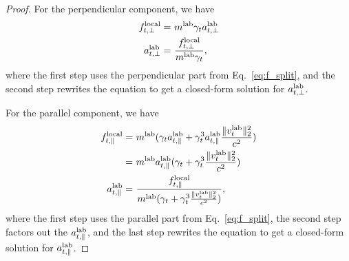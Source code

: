 \begin{proof}
For the perpendicular component, we have
\begin{align*}
    f_{t, \perp}^{\rm local} = & ~ m^{\rm lab}\gamma_t  a_{t,\perp}^{\rm lab} \\
    a_{t,\perp}^{\rm lab} =  & ~ \frac{f_{t, \perp}^{\rm local}}{m^{\rm lab}\gamma_t},
\end{align*}
where the first step uses the perpendicular part from Eq.~\ref{eq:f_split}, and the second step rewrites the equation to get a closed-form solution for $a_{t,\perp}^{\rm lab}$.

For the parallel component, we have
\begin{align*}
    f_{t, \parallel}^{\rm local} = & ~ m^{\rm lab} (\gamma_t  a_{t,\parallel}^{\rm lab} + \gamma_t^3 a_{t,\parallel}^{\rm lab} \frac{\|v_t^{\rm lab}\|_2^2}{c^2}) \\
    = & ~ m^{\rm lab} a_{t,\parallel}^{\rm lab}(\gamma_t + \gamma_t^3 \frac{\|v_t^{\rm lab}\|_2^2}{c^2}) \\
    a_{t,\parallel}^{\rm lab} = & ~ \frac{f_{t, \parallel}^{\rm local}}{m^{\rm lab}(\gamma_t + \gamma_t^3 \frac{\|v_t^{\rm lab}\|_2^2}{c^2})},
\end{align*}
where the first step uses the parallel part from Eq.~\ref{eq:f_split}, the second step factors out the $a_{t,\parallel}^{\rm lab}$, and the last step rewrites the equation to get a closed-form solution for $a_{t,\parallel}^{\rm lab}$.


\end{proof}
